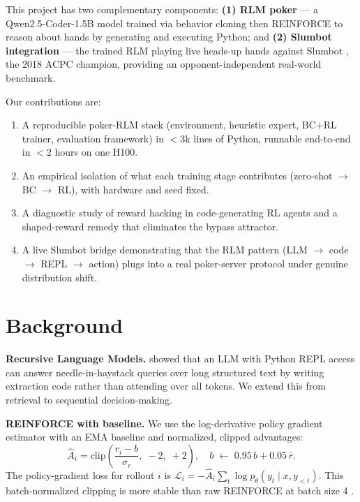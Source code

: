 \documentclass{article}
\begin{document}
This project has two complementary components:
\textbf{(1) RLM poker} — a Qwen2.5-Coder-1.5B model trained via
behavior cloning then REINFORCE to reason about hands by generating and
executing Python; and
\textbf{(2) Slumbot integration} — the trained RLM playing live
heads-up hands against Slumbot \citep{slumbot}, the 2018 ACPC champion,
providing an opponent-independent real-world benchmark.

Our contributions are:
\begin{enumerate}[leftmargin=*,topsep=2pt,itemsep=1pt]
  \item A reproducible poker-RLM stack (environment, heuristic expert,
    BC+RL trainer, evaluation framework) in $<$3k lines of Python,
    runnable end-to-end in $<$2 hours on one H100.
  \item An empirical isolation of what each training stage contributes
    (zero-shot $\to$ BC $\to$ RL), with hardware and seed fixed.
  \item A diagnostic study of reward hacking in code-generating RL agents
    and a shaped-reward remedy that eliminates the bypass attractor.
  \item A live Slumbot bridge demonstrating that the RLM pattern
    (LLM $\to$ code $\to$ REPL $\to$ action) plugs into a real
    poker-server protocol under genuine distribution shift.
\end{enumerate}

\section{Background}

\textbf{Recursive Language Models.}
\citet{zaremba2025} showed that an LLM with Python REPL access can
answer needle-in-haystack queries over long structured text by writing
extraction code rather than attending over all tokens.
We extend this from retrieval to sequential decision-making.

\textbf{REINFORCE with baseline.}
We use the log-derivative policy gradient estimator with an EMA
baseline and normalized, clipped advantages:
\begin{equation}
  \hat{A}_i = \mathrm{clip}\!\left(
    \frac{r_i - b}{\sigma_r},\;-2,\;+2
  \right), \quad
  b \;\leftarrow\; 0.95\,b + 0.05\,\bar{r}.
  \label{eq:adv}
\end{equation}
The policy-gradient loss for rollout $i$ is
$\mathcal{L}_i = -\hat{A}_i\sum_t \log p_\theta(y_t \mid x, y_{<t})$.
This batch-normalized clipping is more stable than raw REINFORCE at
batch size 4 \citep{ahmadian2024}.
\end{document}
